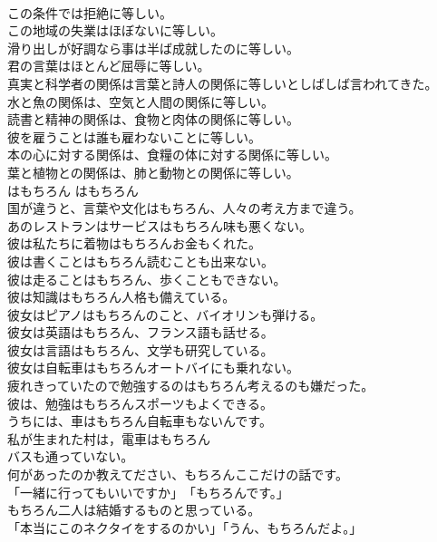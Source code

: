 \documentclass[8pt]{extreport}
\begin{document}
\begin{CJK}{UTF8}{min}
\\	この条件では拒絶に等しい。   
\\	この地域の失業はほぼないに等しい。   
\\	滑り出しが好調なら事は半ば成就したのに等しい。   
\\	君の言葉はほとんど屈辱に等しい。   
\\	真実と科学者の関係は言葉と詩人の関係に等しいとしばしば言われてきた。   
\\	水と魚の関係は、空気と人間の関係に等しい。   
\\	読書と精神の関係は、食物と肉体の関係に等しい。   
\\	彼を雇うことは誰も雇わないことに等しい。   
\\	本の心に対する関係は、食糧の体に対する関係に等しい。   
\\	葉と植物との関係は、肺と動物との関係に等しい。  
\\	はもちろん	はもちろん	
\\	国が違うと、言葉や文化はもちろん、人々の考え方まで違う。  
\\	あのレストランはサービスはもちろん味も悪くない。  
\\	彼は私たちに着物はもちろんお金もくれた。   
\\	彼は書くことはもちろん読むことも出来ない。  
\\	彼は走ることはもちろん、歩くこともできない。   
\\	彼は知識はもちろん人格も備えている。   
\\	彼女はピアノはもちろんのこと、バイオリンも弾ける。   
\\	彼女は英語はもちろん、フランス語も話せる。   
\\	彼女は言語はもちろん、文学も研究している。   
\\	彼女は自転車はもちろんオートバイにも乗れない。  
\\	疲れきっていたので勉強するのはもちろん考えるのも嫌だった。   
\\	彼は、勉強はもちろんスポーツもよくできる。   
\\	うちには、車はもちろん自転車もないんです。  
\\	私が生まれた村は，電車はもちろん 
\\	バスも通っていない。  
\\	何があったのか教えてださい、もちろんここだけの話です。  
\\	「一緒に行ってもいいですか」　「もちろんです。」  
\\	もちろん二人は結婚するものと思っている。   
\\	「本当にこのネクタイをするのかい」「うん、もちろんだよ。」  

\end{CJK}
\end{document}
